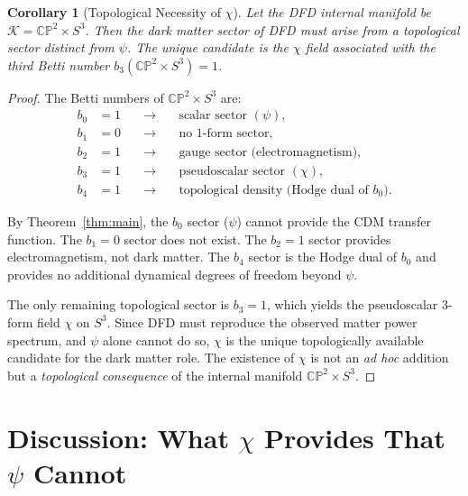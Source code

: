\documentclass[12pt,a4paper]{article}
\newcommand{\CP}{\mathbb{CP}}
\newcommand{\Sph}{S}
\newtheorem{corollary}[theorem]{Corollary}
\begin{document}
\begin{corollary}[Topological Necessity of $\chi$]
\label{cor:chi-required}
Let the DFD internal manifold be $\mathcal{K} = \CP^2 \times \Sph^3$.
Then the dark matter sector of DFD must arise from a topological sector
distinct from $\psi$. The unique candidate is the $\chi$ field
associated with the third Betti number $b_3(\CP^2 \times \Sph^3) = 1$.
\end{corollary}

\begin{proof}
The Betti numbers of $\CP^2 \times \Sph^3$ are:
\begin{equation}
\begin{aligned}
b_0 &= 1 \quad &\longrightarrow\quad &\text{scalar sector } (\psi), \\
b_1 &= 0 \quad &\longrightarrow\quad &\text{no 1-form sector}, \\
b_2 &= 1 \quad &\longrightarrow\quad &\text{gauge sector (electromagnetism)}, \\
b_3 &= 1 \quad &\longrightarrow\quad &\text{pseudoscalar sector } (\chi), \\
b_4 &= 1 \quad &\longrightarrow\quad &\text{topological density (Hodge dual of } b_0).
\end{aligned}
\end{equation}

By Theorem~\ref{thm:main}, the $b_0$ sector ($\psi$) cannot provide
the CDM transfer function. The $b_1 = 0$ sector does not exist.
The $b_2 = 1$ sector provides electromagnetism, not dark matter.
The $b_4$ sector is the Hodge dual of $b_0$ and provides no
additional dynamical degrees of freedom beyond $\psi$.

The only remaining topological sector is $b_3 = 1$, which yields
the pseudoscalar 3-form field $\chi$ on $\Sph^3$. Since DFD must
reproduce the observed matter power spectrum, and $\psi$ alone
cannot do so, $\chi$ is the unique topologically available candidate
for the dark matter role. The existence of $\chi$ is not an
\emph{ad hoc} addition but a \emph{topological consequence} of the
internal manifold $\CP^2 \times \Sph^3$.
\end{proof}

\section{Discussion: What $\chi$ Provides That $\psi$ Cannot}
\label{sec:discussion}
\end{document}
